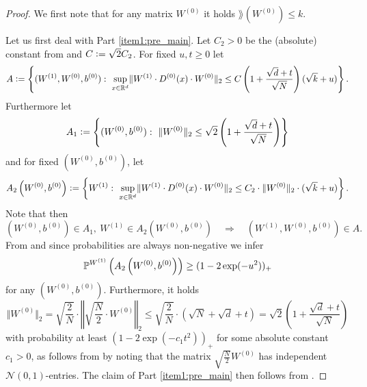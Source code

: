 \begin{proof}
We first note that for any matrix $W^{(0)}$ it holds $\rang(W^{(0)}) \leq k$. 

Let us first deal with Part \eqref{item1:pre_main}. Let $C_2 > 0$ be the (absolute) constant from  and $C \mathrel{\mathop:}= \sqrt{2}C_2$. For fixed $u,t \geq 0$ let 
\begin{equation*}
A \mathrel{\mathop:}= \left\{ (W^{(1)}, W^{(0)}, b^{(0)}): \ \underset{x \in \mathbb{R}^d}{\sup} \Vert W^{(1)} \cdot D^{(0)}(x) \cdot W^{(0)}\Vert_2 \leq C \left(1 + \frac{\sqrt{d} + t}{\sqrt{N}}\right)(\sqrt{k} + u)\right\}.
\end{equation*}
Furthermore let 
\begin{equation*}
A_1 \defeq \left\{ (W^{(0)}, b^{(0)}) : \ \Vert W^{(0)} \Vert_2 \leq \sqrt{2} \left(1 + \frac{\sqrt{d} + t}{\sqrt{N}}\right)\right\}
\end{equation*}
and for fixed $(W^{(0)}, b^{(0)})$, let
\begin{equation*}
A_2\left(W^{(0)}, b^{(0)}\right) \mathrel{\mathop:}=  \left\{ W^{(1)}: \ \underset{x \in \mathbb{R}^d}{\sup} \Vert W^{(1)} \cdot D^{(0)}(x) \cdot W^{(0)}\Vert_2 \leq C_2 \cdot \Vert W^{(0)}  \Vert_2 \cdot (\sqrt{k} + u)\right\}.
\end{equation*}
Note that then
\begin{equation*}
(W^{(0)}, b^{(0)}) \in A_1, \ W^{(1)} \in A_2\left(W^{(0)}, b^{(0)}\right) \quad \Longrightarrow \quad  (W^{(1)}, W^{(0)}, b^{(0)}) \in A.
\end{equation*}
From  and since probabilities are always non-negative we infer
\begin{equation*}
\mathbb{P}^{W^{(1)}} \left(A_2\left(W^{(0)}, b^{(0)}\right)\right) \geq (1 - 2\exp(-u^2))_+
\end{equation*}
for any $(W^{(0)}, b^{(0)})$. Furthermore, it holds 
\begin{equation*}
\Vert W^{(0)} \Vert_2 = \sqrt{\frac{2}{N}} \cdot \left\Vert \sqrt{\frac{N}{2}} \cdot W^{(0)} \right\Vert_2 \leq \sqrt{\frac{2}{N}}\cdot (\sqrt{N} + \sqrt{d} + t) = \sqrt{2}\left(1 + \frac{\sqrt{d} + t}{\sqrt{N}}\right)
\end{equation*}
with probability at least $(1 - 2 \exp(-c_1 t^2))_+$ for some absolute constant $c_1 > 0$, as follows from \cite[Corollary 7.3.3]{vershynin_high-dimensional_2018} by noting that the matrix $\sqrt{\frac{N}{2}} W^{(0)}$ has independent $\mathcal{N}(0,1)$-entries. The claim of Part \eqref{item1:pre_main} then follows from .


\end{proof}
